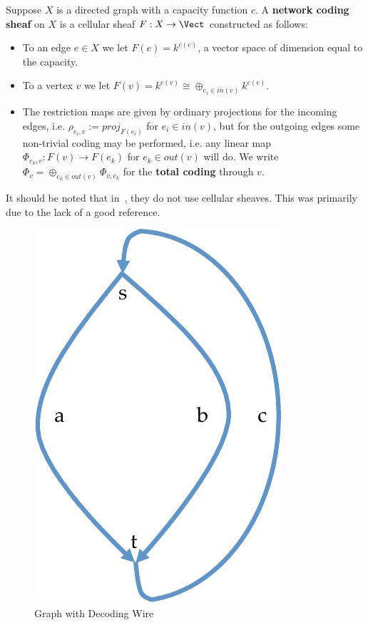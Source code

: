 \begin{defn}
	Suppose $X$ is a directed graph with a capacity function $c$. A \textbf{network coding sheaf} on $X$ is a cellular sheaf $F:X\to\Vect$ constructed as follows: 
	\begin{itemize}
		\item To an edge $e\in X$ we let $F(e)=k^{c(e)}$, a vector space of dimension equal to the capacity.
		\item To a vertex $v$ we let $F(v)=k^{c(v)}\cong \oplus_{e_i\in in(v)} k^{c(e)}$.
		\item The restriction maps are given by ordinary projections for the incoming edges, i.e. $\rho_{e_i,v}:=proj_{F(e_i)}$ for $e_i\in in(v)$, but for the outgoing edges some non-trivial coding may be performed, i.e. any linear map $\Phi_{e_k,v}:F(v)\to F(e_k)$ for $e_k\in out(v)$ will do. We write $\Phi_v=\oplus_{e_k\in out(v)} \Phi_{v,e_k}$ for the \textbf{total coding} through $v$.
	\end{itemize}
\end{defn}

\begin{rmk}
	It should be noted that in~\cite{GH-ncs}, they do not use cellular sheaves. This was primarily due to the lack of a good reference.
\end{rmk}

\begin{figure}[ht]
\centering
\includegraphics[width=.5\textwidth]{nc_graph_dir.pdf}
\caption{Graph with Decoding Wire}
\label{fig:nc_graph_dir}
\end{figure}

